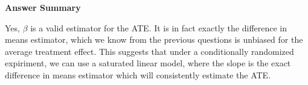\documentclass[
  11pt,
  letterpaper,
  DIV=11,
  numbers=noendperiod]{scrartcl}
\begin{document}
\begin{tcolorbox}[enhanced jigsaw, arc=.35mm, colback=white, bottomrule=.15mm, breakable, opacityback=0, rightrule=.15mm, toprule=.15mm, leftrule=.75mm, left=2mm, colframe=quarto-callout-note-color-frame]

\textbf{Answer Summary}\vspace{2mm}

Yes, \(\beta\) is a valid estimator for the ATE. It is in fact exactly
the difference in means estimator, which we know from the previous
questions is unbiased for the average treatment effect. This suggests
that under a conditionally randomized expiriment, we can use a saturated
linear model, where the slope is the exact difference in means estimator
which will consistently estimate the ATE.

\end{tcolorbox}
\end{document}

